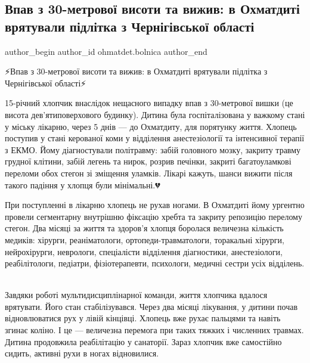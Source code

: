  
 
 
 
 

\subsection{Впав з 30-метрової висоти та вижив: в Охматдиті врятували підлітка з Чернігівської області}
\label{sec:17_01_2023.fb.ohmatdet.bolnica.1.vpav_z_30_metrovo__v}

\ifcmt
 author_begin
   author_id ohmatdet.bolnica
 author_end
\fi

⚡️Впав з 30-метрової висоти та вижив: в Охматдиті врятували підлітка з
Чернігівської області⚡️

15-річний хлопчик внаслідок нещасного випадку впав з 30-метрової вишки (це
висота дев’ятиповерхового будинку). Дитина була госпіталізована у важкому стані
у міську лікарню, через 5 днів — до Охматдиту, для порятунку життя. Хлопець
поступив у стані керованої коми у відділення анестезіології та інтенсивної
терапії з ЕКМО. Йому діагностували політравму: забій головного мозку, закриту
травму грудної клітини, забій легень та нирок, розрив печінки, закриті
багатоуламкові переломи обох стегон зі зміщення уламків. Лікарі кажуть, шанси
вижити після такого падіння у хлопця були мінімальні.💔

При поступленні в лікарню хлопець не рухав ногами. В Охматдиті йому ургентно
провели сегментарну внутрішню фіксацію хребта та закриту репозицію перелому
стегон. Два місяці за життя та здоров’я хлопця боролася величезна кількість
медиків: хірурги, реаніматологи, ортопеди-травматологи, торакальні хірурги,
нейрохірурги, неврологи, спеціалісти відділення діагностики, анестезіологи,
реабілітологи, педіатри, фізіотерапевти, психологи, медичні сестри усіх
відділень.🙏🏻

Завдяки роботі мультидисциплінарної команди, життя хлопчика вдалося врятувати.
Його стан стабілізувався. Через два місяці лікування, у дитини почав
відновлюватися рух у лівій кінцівці. Хлопець вже рухає пальцями та навіть
згинає коліно. І це — величезна перемога при таких тяжких і численних травмах.
Дитина продовжила реабілітацію у санаторії. Зараз хлопчик вже самостійно
сидить, активні рухи в ногах відновилися.🙌🏻

